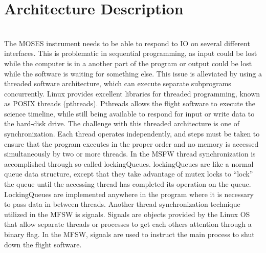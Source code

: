 %
\section{Architecture Description}
\hrulefill
\\
The MOSES instrument needs to be able to respond to IO on several different interfaces. This is problematic in sequential programming, as input could be lost while the computer is in a another part of the program or output could be lost while the software is waiting for something else. This issue is alleviated by using a threaded software architecture, which can execute separate subprograms concurrently. Linux provides excellent libraries for threaded programming, known as POSIX threads (pthreads). Pthreads allows the flight software to execute the science timeline, while still being available to respond for input or write data to the hard-disk drive. 
The challenge with this threaded architecture is one of synchronization. Each thread operates independently, and steps must be taken to ensure that the program executes in the proper order and no memory is accessed simultaneously by two or more threads. In the MSFW thread synchronization is accomplished through so-called lockingQueues. lockingQueues are like a normal queue data structure, except that they take advantage of mutex locks to “lock” the queue until the accessing thread has completed its operation on the queue. LockingQueues are implemented anywhere in the program where it is necessary to pass data in between threads.
Another thread synchronization technique utilized in the MFSW is signals. Signals are objects provided by the Linux OS that allow separate threads or processes to get each others attention through a binary flag. In the MFSW, signals are used to instruct the main process to shut down the flight software.
